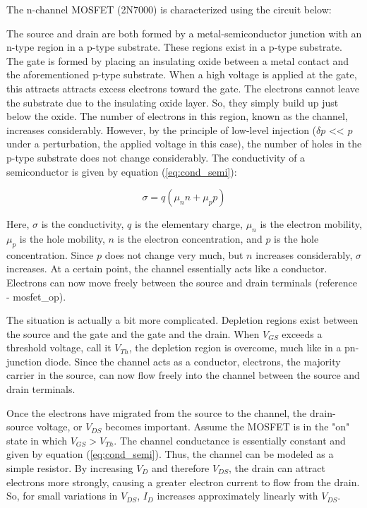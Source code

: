 The n-channel MOSFET (2N7000) is characterized using the circuit below:


The source and drain are both formed by a metal-semiconductor junction with an n-type region in a p-type substrate. These regions exist in a p-type substrate. The gate is formed by placing an insulating oxide between a metal contact and the aforementioned p-type substrate. When a high voltage is applied at the gate, this attracts attracts excess electrons toward the gate. The electrons cannot leave the substrate due to the insulating oxide layer. So, they simply build up just below the oxide. The number of electrons in this region, known as the channel, increases considerably. However, by the principle of low-level injection ($\delta p$ << $p$ under a perturbation, the applied voltage in this case), the number of holes in the p-type substrate does not change considerably. The conductivity of a semiconductor is given by equation (\ref{eq:cond_semi}):

\begin{equation}
	\label{eq:cond_semi}
	\sigma = q(\mu_n n + \mu_p p)
\end{equation}

Here, $\sigma$ is the conductivity, $q$ is the elementary charge, $\mu_n$ is the electron mobility, $\mu_p$ is the hole mobility, $n$ is the electron concentration, and $p$ is the hole concentration. Since $p$ does not change very much, but $n$ increases considerably, $\sigma$ increases. At a certain point, the channel essentially acts like a conductor. Electrons can now move freely between the source and drain terminals (reference - mosfet_op).

The situation is actually a bit more complicated. Depletion regions exist between the source and the gate and the gate and the drain. When $V_{GS}$ exceeds a threshold voltage, call it $V_{Th}$, the depletion region is overcome, much like in a pn-junction diode. Since the channel acts as a conductor, electrons, the majority carrier in the source, can now flow freely into the channel between the source and drain terminals.

Once the electrons have migrated from the source to the channel, the drain-source voltage, or $V_{DS}$ becomes important. Assume the MOSFET is in the "on" state in which $V_{GS} > V_{Th}$. The channel conductance is essentially constant and given by equation (\ref{eq:cond_semi}). Thus, the channel can be modeled as a simple resistor. By increasing $V_{D}$ and therefore $V_{DS}$, the drain can attract electrons more strongly, causing a greater electron current to flow from the drain. So, for small variations in $V_{DS}$, $I_{D}$ increases approximately linearly with $V_{DS}$.

